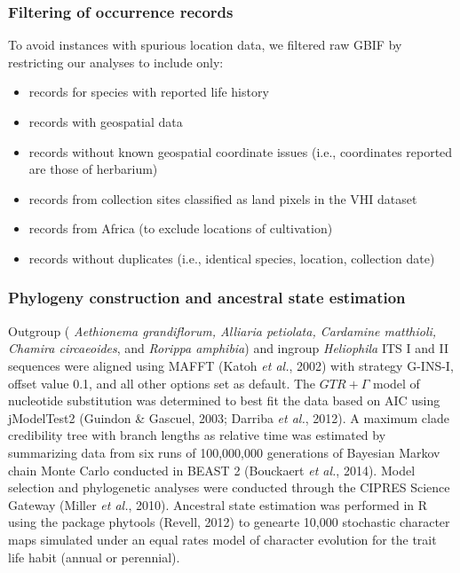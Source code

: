 \documentclass[man,floatsintext]{apa6}
\providecommand{\tightlist}{%
  \setlength{\itemsep}{0pt}\setlength{\parskip}{0pt}}
\theoremstyle{definition}
\theoremstyle{definition}
\theoremstyle{definition}
\theoremstyle{remark}
\begin{document}
\hypertarget{filtering-of-occurrence-records}{%
\subsubsection{Filtering of occurrence
records}\label{filtering-of-occurrence-records}}

To avoid instances with spurious location data, we filtered raw GBIF by
restricting our analyses to include only:

\begin{itemize}
\tightlist
\item
  records for species with reported life history\\
\item
  records with geospatial data\\
\item
  records without known geospatial coordinate issues (i.e., coordinates
  reported are those of herbarium)\\
\item
  records from collection sites classified as land pixels in the VHI
  dataset\\
\item
  records from Africa (to exclude locations of cultivation)
\item
  records without duplicates (i.e., identical species, location,
  collection date)
\end{itemize}

\hypertarget{phylogeny-construction-and-ancestral-state-estimation}{%
\subsubsection{Phylogeny construction and ancestral state
estimation}\label{phylogeny-construction-and-ancestral-state-estimation}}

Outgroup ( \emph{Aethionema grandiflorum, Alliaria petiolata, Cardamine
matthioli, Chamira circaeoides}, and \emph{Rorippa amphibia}) and
ingroup \emph{Heliophila} ITS I and II sequences were aligned using
MAFFT (Katoh \emph{et al.}, 2002) with strategy G-INS-I, offset value
0.1, and all other options set as default. The \(GTR + \Gamma\) model of
nucleotide substitution was determined to best fit the data based on AIC
using jModelTest2 (Guindon \& Gascuel, 2003; Darriba \emph{et al.},
2012). A maximum clade credibility tree with branch lengths as relative
time was estimated by summarizing data from six runs of 100,000,000
generations of Bayesian Markov chain Monte Carlo conducted in BEAST 2
(Bouckaert \emph{et al.}, 2014). Model selection and phylogenetic
analyses were conducted through the CIPRES Science Gateway (Miller
\emph{et al.}, 2010). Ancestral state estimation was performed in R
using the package phytools (Revell, 2012) to genearte 10,000 stochastic
character maps simulated under an equal rates model of character
evolution for the trait life habit (annual or perennial).
\end{document}
